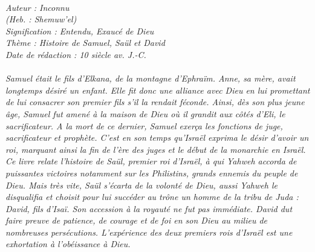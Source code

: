 \BFont
\noindent\hrulefill
{\footnotesize
\textit{
\bigskip
{\centering{}
\\Auteur : Inconnu
\\(Heb. : Shemuw'el)
\\Signification : Entendu, Exaucé de Dieu
\\Thème : Histoire de Samuel, Saül et David
\\Date de rédaction : 10 siècle av. J.-C.\\}
}
\textit{
\\Samuel était le fils d'Elkana, de la montagne d'Ephraïm. Anne, sa mère, avait longtemps désiré un enfant. Elle fit donc une alliance avec Dieu en lui promettant de lui consacrer son premier fils s'il la rendait féconde. Ainsi, dès son plus jeune âge, Samuel fut amené à la maison de Dieu où il grandit aux côtés d'Eli, le sacrificateur. A la mort de ce dernier, Samuel exerça les fonctions de juge, sacrificateur et prophète. C'est en son temps qu'Israël exprima le désir d'avoir un roi, marquant ainsi la fin de l'ère des juges et le début de la monarchie en Israël.
\\Ce livre relate l'histoire de Saül, premier roi d'Israël, à qui Yahweh accorda de puissantes victoires notamment sur les Philistins, grands ennemis du peuple de Dieu. Mais très vite, Saül s'écarta de la volonté de Dieu, aussi Yahweh le disqualifia et choisit pour lui succéder au trône un homme de la tribu de Juda : David, fils d'Isaï. Son accession à la royauté ne fut pas immédiate. David dut faire preuve de patience, de courage et de foi en son Dieu au milieu de nombreuses persécutions. L'expérience des deux premiers rois d'Israël est une exhortation à l'obéissance à Dieu.\bigskip
}
}
\par\nobreak\noindent\hrulefill
